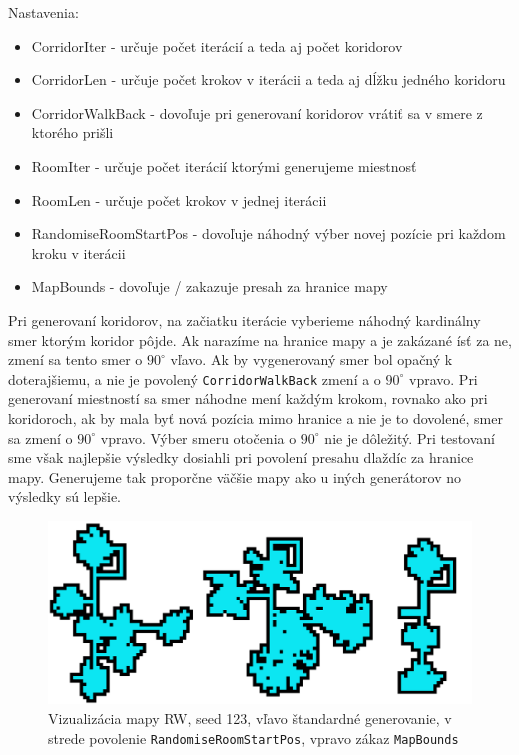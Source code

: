 \noindent Nastavenia:

\begin{itemize}
    \item CorridorIter - určuje počet iterácií a teda aj počet koridorov
    \item CorridorLen - určuje počet krokov v iterácii a teda aj dĺžku jedného koridoru
    \item CorridorWalkBack - dovoľuje pri generovaní koridorov vrátiť sa v smere z ktorého prišli
    \item RoomIter - určuje počet iterácií ktorými generujeme miestnosť
    \item RoomLen - určuje počet krokov v jednej iterácii 
    \item RandomiseRoomStartPos - dovoľuje náhodný výber novej pozície pri každom kroku v iterácii
    \item MapBounds - dovoľuje / zakazuje presah za hranice mapy
\end{itemize}

Pri generovaní koridorov, na začiatku iterácie vyberieme náhodný kardinálny smer ktorým koridor pôjde. Ak narazíme na hranice mapy a je zakázané ísť za ne, zmení sa tento smer o $90^\circ$ vľavo. Ak by vygenerovaný smer bol opačný k doterajšiemu, a nie je povolený \verb|CorridorWalkBack| zmení a o $90^\circ$ vpravo. Pri generovaní miestností sa smer náhodne mení každým krokom, rovnako ako pri koridoroch, ak by mala byť nová pozícia mimo hranice a nie je to dovolené, smer sa zmení o $90^\circ$ vpravo. Výber smeru otočenia o $90^\circ$ nie je dôležitý. Pri testovaní sme však najlepšie výsledky dosiahli pri povolení presahu dlaždíc za hranice mapy. Generujeme tak proporčne väčšie mapy ako u iných generátorov no výsledky sú lepšie. 

\begin{figure} [H]
    \centering
    \includegraphics[width=0.65\linewidth]{obrazky-figures/rw.png}
    \caption{Vizualizácia mapy RW, seed 123, vľavo štandardné generovanie, v strede povolenie \texttt{RandomiseRoomStartPos}, vpravo zákaz \texttt{MapBounds}}
    \label{fig:enter-label}
\end{figure}

